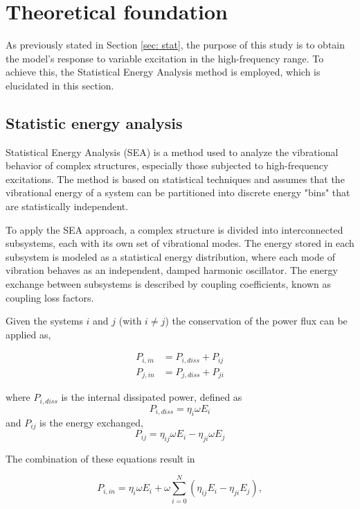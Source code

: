 \section{Theoretical foundation} \label{sec: ft}

As previously stated in Section \ref{sec: stat}, the purpose of this study is to obtain the model's response to variable excitation in the high-frequency range. To achieve this, the Statistical Energy Analysis method is employed, which is elucidated in this section.


\subsection{Statistic energy analysis}
Statistical Energy Analysis (SEA) is a method used to analyze the vibrational behavior of complex structures, especially those subjected to high-frequency excitations. The method is based on statistical techniques and assumes that the vibrational energy of a system can be partitioned into discrete energy "bins" that are statistically independent.

To apply the SEA approach, a complex structure is divided into interconnected subsystems, each with its own set of vibrational modes. The energy stored in each subsystem is modeled as a statistical energy distribution, where each mode of vibration behaves as an independent, damped harmonic oscillator. The energy exchange between subsystems is described by coupling coefficients, known as coupling loss factors.

Given the systems $i$ and $j$ (with $i\neq j$) the conservation of the power flux can be applied as,

\begin{align}
P_{i,in} &= P_{i,diss} + P_{ij}\\
P_{j,in} &= P_{j,diss} + P_{ji}
\end{align}

where $P_{i,diss}$ is the internal dissipated power, defined as 
\begin{equation}
P_{i,diss} = \eta_i \omega E_i
\end{equation}
and $P_{ij}$ is the energy exchanged, 
\begin{equation}
P_{ij} = \eta_{ij} \omega E_i -\eta_{ji} \omega E_j
\end{equation}

The combination of these equations result in 

\begin{equation}
P_{i,in} = \eta_i \omega E_i + \omega \sum_{i=0}^N  (\eta_{ij}  E_i -\eta_{ji}  E_j),
\end{equation}

